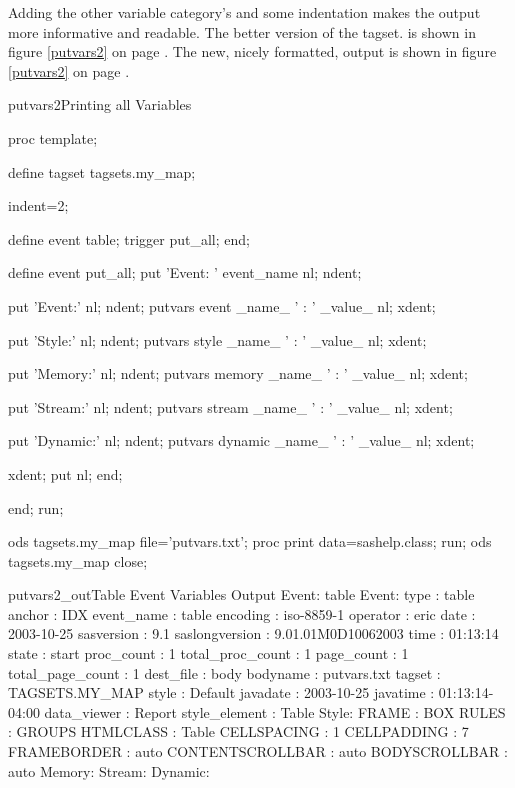 Adding the other variable category's and some indentation makes
the output more informative and readable.
The better version of the tagset.
is shown in figure \ref{putvars2} on page \pageref{putvars2}.
The new, nicely formatted, output is shown in 
figure \ref{putvars2} on page \pageref{putvars2}.

\begin{fvcode}{putvars2}{Printing all Variables}

proc template;

    define tagset tagsets.my_map;

        indent=2;

        define event table;
            trigger put_all;
        end;

        define event put_all;
            put 'Event: ' event_name nl;
            ndent;

            put 'Event:' nl;
            ndent;
            putvars event _name_ ' : ' _value_ nl;
            xdent;

            put 'Style:' nl;
            ndent;
            putvars style _name_ ' : ' _value_ nl;
            xdent;

            put 'Memory:' nl;
            ndent;
            putvars memory _name_ ' : ' _value_ nl;
            xdent;

            put 'Stream:' nl;
            ndent;
            putvars stream _name_ ' : ' _value_ nl;
            xdent;

            put 'Dynamic:' nl;
            ndent;
            putvars dynamic _name_ ' : ' _value_ nl;
            xdent;

            xdent;
            put nl;
        end;

     end;
run;

ods tagsets.my_map file='putvars.txt';
proc print data=sashelp.class; run;
ods tagsets.my_map close;

\end{fvcode}

\begin{poutput}{putvars2_out}{Table Event Variables Output}
Event: table
  Event:
    type : table
    anchor : IDX
    event_name : table
    encoding : iso-8859-1
    operator : eric
    date : 2003-10-25
    sasversion : 9.1
    saslongversion : 9.01.01M0D10062003
    time : 01:13:14
    state : start
    proc_count : 1
    total_proc_count : 1
    page_count : 1
    total_page_count : 1
    dest_file : body
    bodyname : putvars.txt
    tagset : TAGSETS.MY_MAP
    style : Default
    javadate : 2003-10-25
    javatime : 01:13:14-04:00
    data_viewer : Report
    style_element : Table
  Style:
    FRAME : BOX
    RULES : GROUPS
    HTMLCLASS : Table
    CELLSPACING : 1
    CELLPADDING : 7
    FRAMEBORDER : auto
    CONTENTSCROLLBAR : auto
    BODYSCROLLBAR : auto
  Memory:
  Stream:
  Dynamic:
\end{poutput}

